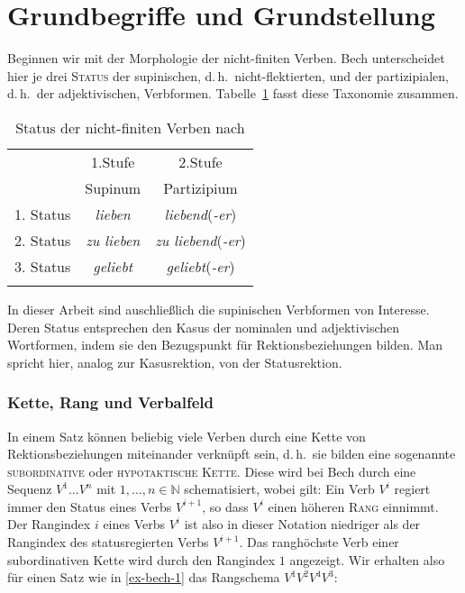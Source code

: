 \section{Grundbegriffe und Grundstellung} \label{sec-kohaerenz-einf}

Beginnen wir mit der Morphologie der nicht-finiten Verben. Bech unterscheidet hier je drei \textsc{Status} der supinischen, d.\,h.\ nicht-flektierten, und der partizipialen, d.\,h.\ der adjektivischen, Verb\-for\-men. Tabelle~\ref{fig-status} fasst diese Taxonomie zusammen.   
\begin{table}[h] %
\centering
\begin{tabular}{ccc}
\lsptoprule
& 1.Stufe	& 2.Stufe 	\\
& Supinum	& Partizipium	\\
\cmidrule{2-3}
1. Status	& \emph{lieben}	& \emph{liebend}(\emph{-er})\\
2. Status	& \emph{zu lieben} & \emph{zu liebend}(\emph{-er})\\
3. Status	& \emph{geliebt}& \emph{geliebt}(\emph{-er})\\
\lspbottomrule
\end{tabular}
\caption{Status der nicht-finiten Verben nach \cite{Bech:55} \label{fig-status}}
\end{table}

In dieser Arbeit sind auschlie\ss lich die supinischen Verb\-formen von Interesse. Deren Status entsprechen den Kasus der nominalen und adjektivischen Wortformen, indem sie den Bezugspunkt für Rektionsbeziehungen bilden. Man spricht hier, analog zur Kasusrektion, von der Statusrektion. 

\subsubsection*{Kette, Rang und Verbalfeld}

In einem Satz können beliebig viele Verben durch eine Kette von Rektionsbeziehungen miteinander verknüpft sein, d.\,h.\ sie bilden eine sogenannte \textsc{subordinative} oder \textsc{hypotaktische Kette}. Diese wird bei Bech durch eine Sequenz $V^{1} \ldots V^{n}$ mit $1, \ldots , n \in \mathbb{N}$ schematisiert, wobei gilt: Ein Verb $V^i$ regiert immer den Status eines Verbs $V^{i+1}$, so dass $V^i$ einen höheren \textsc{Rang} einnimmt. Der Rangindex $i$ eines Verbs $V^i$ ist also in dieser Notation niedriger als der Rangindex des statusregierten Verbs $V^{i+1}$. Das ranghöchste Verb einer subordinativen Kette wird durch den Rangindex $1$ angezeigt. Wir erhalten also für einen Satz wie in \ref{ex-bech-1} das Rangschema $V^1 V^2 V^4 V^3$:

